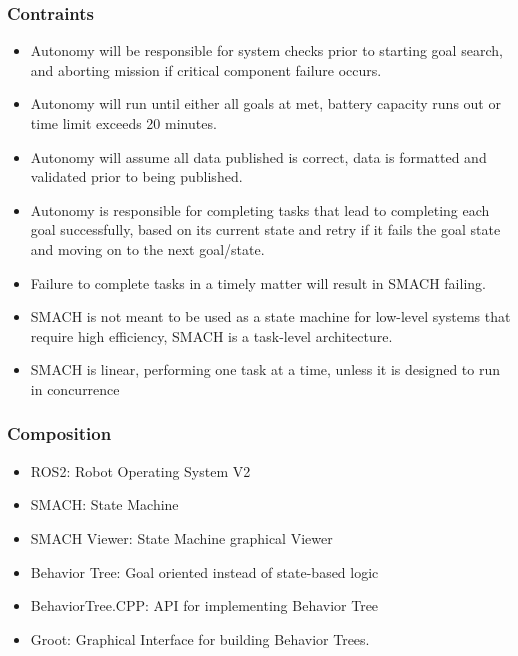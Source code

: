 \subsubsection{Contraints}
\label{sec:constraints}
\begin{itemize}
    \item Autonomy will be responsible for system checks prior to starting goal
        search, and aborting mission if critical component failure occurs. 
    \item Autonomy will run until either all goals at met, battery capacity
        runs out or time limit exceeds 20 minutes.
    \item Autonomy will assume all data published is correct, data is formatted
        and validated prior to being published. 
    \item Autonomy is responsible for completing tasks that lead to completing
        each goal successfully, based on its current state and retry if it fails
        the goal state and moving on to the next goal/state. 
    \item Failure to complete tasks in a timely matter will result in SMACH
        failing. 
    \item SMACH is not meant to be used as a state machine for low-level
        systems that require high efficiency, SMACH is a task-level
        architecture.
    \item SMACH is linear, performing one task at a time, unless it is designed
        to run in concurrence
\end{itemize}

\subsubsection{Composition}
\label{sec:autonomy_composition}

\begin{itemize}
    \item ROS2: Robot Operating System V2 
    \item SMACH: State Machine 
    \item SMACH Viewer: State Machine graphical Viewer 
    \item Behavior Tree: Goal oriented instead of state-based logic 
    \item BehaviorTree.CPP: API for implementing Behavior Tree 
    \item Groot: Graphical Interface for building Behavior Trees.
\end{itemize}

